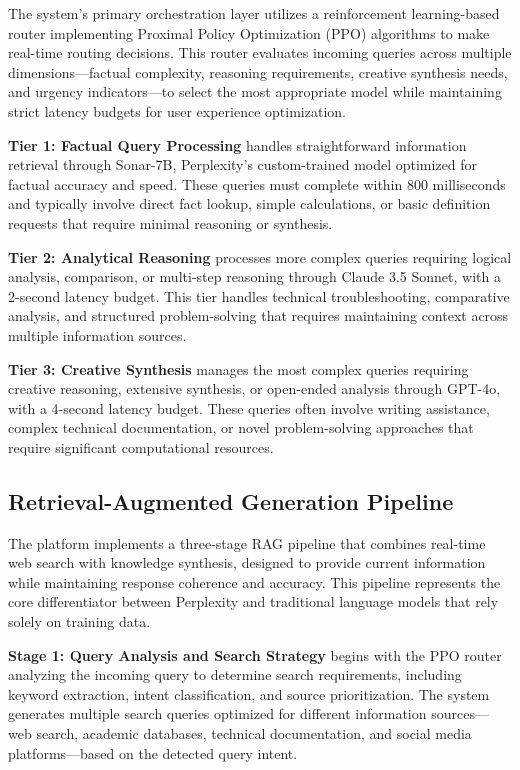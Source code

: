 \documentclass[12pt]{article}
\begin{document}
The system's primary orchestration layer utilizes a reinforcement learning-based router implementing Proximal Policy Optimization (PPO) algorithms to make real-time routing decisions. This router evaluates incoming queries across multiple dimensions—factual complexity, reasoning requirements, creative synthesis needs, and urgency indicators—to select the most appropriate model while maintaining strict latency budgets for user experience optimization.

\textbf{Tier 1: Factual Query Processing} handles straightforward information retrieval through Sonar-7B, Perplexity's custom-trained model optimized for factual accuracy and speed. These queries must complete within 800 milliseconds and typically involve direct fact lookup, simple calculations, or basic definition requests that require minimal reasoning or synthesis.

\textbf{Tier 2: Analytical Reasoning} processes more complex queries requiring logical analysis, comparison, or multi-step reasoning through Claude 3.5 Sonnet, with a 2-second latency budget. This tier handles technical troubleshooting, comparative analysis, and structured problem-solving that requires maintaining context across multiple information sources.

\textbf{Tier 3: Creative Synthesis} manages the most complex queries requiring creative reasoning, extensive synthesis, or open-ended analysis through GPT-4o, with a 4-second latency budget. These queries often involve writing assistance, complex technical documentation, or novel problem-solving approaches that require significant computational resources.

\subsection{Retrieval-Augmented Generation Pipeline}

The platform implements a three-stage RAG pipeline that combines real-time web search with knowledge synthesis, designed to provide current information while maintaining response coherence and accuracy. This pipeline represents the core differentiator between Perplexity and traditional language models that rely solely on training data.

\textbf{Stage 1: Query Analysis and Search Strategy} begins with the PPO router analyzing the incoming query to determine search requirements, including keyword extraction, intent classification, and source prioritization. The system generates multiple search queries optimized for different information sources—web search, academic databases, technical documentation, and social media platforms—based on the detected query intent.
\end{document}
